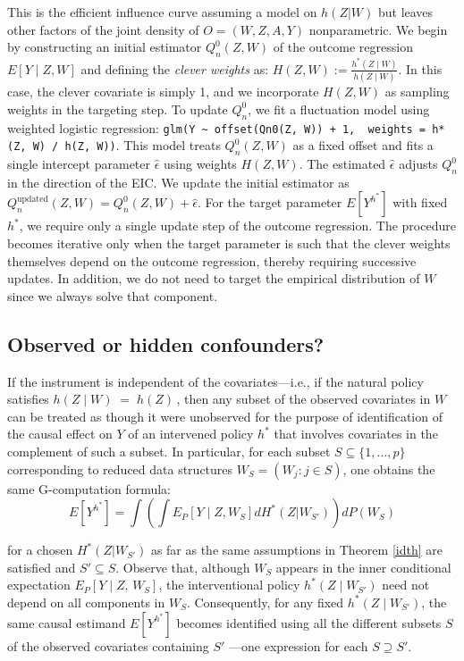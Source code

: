 \documentclass[12pt]{article}
\theoremstyle{thmstyleone}%
\theoremstyle{thmstyletwo}%
\theoremstyle{thmstylethree}%
\begin{document}
This is the efficient influence curve assuming a model on $h(Z|W)$ but leaves other factors of the joint density of $O=(W,Z,A,Y)$ nonparametric. We begin by constructing an initial estimator $Q_n^0(Z, W)$ of the outcome regression $E[Y \mid Z, W]$ and defining the \textit{clever weights} as:
$H(Z, W) := \frac{h^*(Z \mid W)}{h(Z \mid W)}$. In this case, the clever covariate is simply 1, and we incorporate $H(Z, W)$ as sampling weights in the targeting step. To update $Q_n^0$, we fit a fluctuation model using weighted logistic regression: \verb|glm(Y ~ offset(Qn0(Z, W)) + 1,  weights = h*(Z, W) / h(Z, W))|. This model treats $Q_n^0(Z, W)$ as a fixed offset and fits a single intercept parameter $\hat{\epsilon}$ using weights $H(Z, W)$. The estimated $\hat{\epsilon}$ adjusts $Q_n^0$ in the direction of the EIC. We update the initial estimator as $Q_n^{\text{updated}}(Z, W) = Q_n^0(Z, W)+ \hat{\epsilon}$. {For the target parameter $E[Y^{h^*}]$ with fixed $h^*$, we require only a single update step of the outcome regression. The procedure becomes iterative only when the target parameter is such that the clever weights themselves depend on the outcome regression, thereby requiring successive updates.}  In addition, we do not need to target the empirical distribution of $W$ since we always solve that component. 

\subsection{Observed or hidden confounders?}\label{hidnohid}

If the instrument is independent of the covariates---i.e., if the natural policy satisfies $h(Z \mid W) \;=\; h(Z)\,$,
then any subset of the observed covariates in $W$ can be treated as though it were unobserved for the purpose of identification of the causal effect on $Y$ of an intervened policy $h^*$ that involves covariates in the complement of such a subset. In particular, for each subset $S \subseteq \{1,\ldots,p\}$ corresponding to reduced data structures $W_S = (W_j : j \in S)$, one obtains the same G-computation formula:
\begin{equation}\label{eq:identification_family}
	E[Y^{h^*}] = \int \left( \int  E_P[Y \mid Z, W_S] dH^*(Z|W_{S'})\right)dP(W_S)
\end{equation}

for a chosen $H^*(Z|W_{S'})$ as far as the same assumptions in Theorem \ref{idth} are satisfied and $S' \subseteq S$. Observe that, although $W_S$ appears in the inner conditional expectation $E_P[Y \mid Z,\,W_S]$, the interventional policy $h^*(Z \mid W_{S'})$ need not depend on all components in $W_S$. Consequently, for any fixed $h^*(Z \mid W_{S'})$, the same causal estimand $E[Y^{h^*}]$ becomes identified using all the different subsets $S$ of the observed covariates containing $S'$ ---one expression for each $S \supseteq S'$. 
\end{document}
